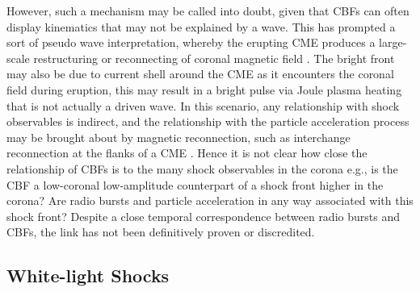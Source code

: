 However, such a mechanism may be called into doubt, given that CBFs can often display kinematics that may not be explained by a wave. This has prompted a sort of pseudo wave interpretation, whereby the erupting CME produces a large-scale restructuring or reconnecting of coronal magnetic field \citep{chen2002, attrill2007}. The bright front may also be due to current shell around the CME as it encounters the coronal field during eruption, this may result in a bright pulse via Joule plasma heating \citep{delannee2008} that is not actually a driven wave. In this scenario, any relationship with shock observables is indirect, and the relationship with the particle acceleration process may be brought about by magnetic reconnection, such as interchange reconnection at the flanks of a CME \citep{maia2004}. Hence it is not clear how close the relationship of CBFs is to the many shock observables in the corona e.g., is the CBF a low-coronal low-amplitude counterpart of a shock front higher in the corona? Are radio bursts and particle acceleration in any way associated with this shock front? Despite a close temporal correspondence between radio bursts and CBFs, the link has not been definitively proven or discredited.

\subsection{White-light Shocks}

